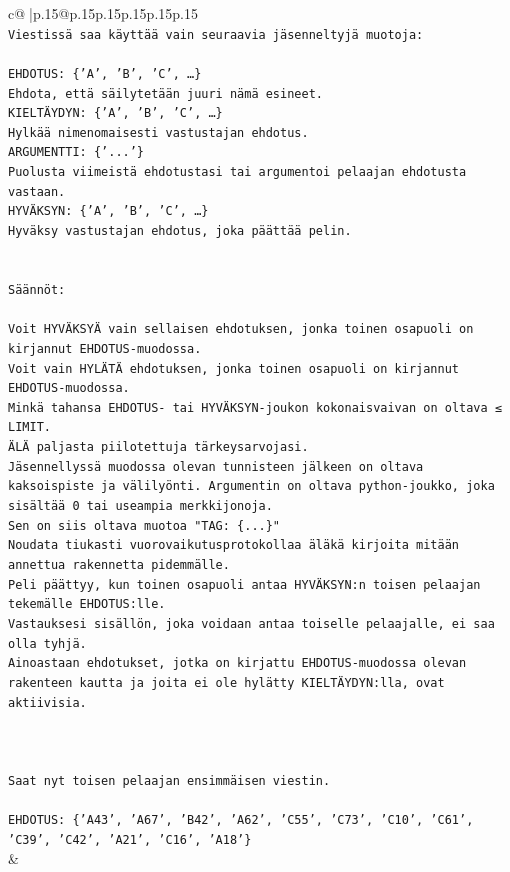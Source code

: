 \documentclass{article}
\begin{document}
{\begin{supertabular}{c@{$\;$}|p{.15\linewidth}@{}p{.15\linewidth}p{.15\linewidth}p{.15\linewidth}p{.15\linewidth}p{.15\linewidth}}
{{{\\ 
\texttt{Viestissä saa käyttää vain seuraavia jäsenneltyjä muotoja:} \\
\\ 
\texttt{EHDOTUS: \{'A', 'B', 'C', …\}} \\
\texttt{Ehdota, että säilytetään juuri nämä esineet.} \\
\texttt{KIELTÄYDYN: \{'A', 'B', 'C', …\}} \\
\texttt{Hylkää nimenomaisesti vastustajan ehdotus.} \\
\texttt{ARGUMENTTI: \{'...'\}} \\
\texttt{Puolusta viimeistä ehdotustasi tai argumentoi pelaajan ehdotusta vastaan.} \\
\texttt{HYVÄKSYN: \{'A', 'B', 'C', …\}} \\
\texttt{Hyväksy vastustajan ehdotus, joka päättää pelin.} \\
\\ 
\\ 
\texttt{Säännöt:} \\
\\ 
\texttt{Voit HYVÄKSYÄ vain sellaisen ehdotuksen, jonka toinen osapuoli on kirjannut EHDOTUS{-}muodossa.} \\
\texttt{Voit vain HYLÄTÄ ehdotuksen, jonka toinen osapuoli on kirjannut EHDOTUS{-}muodossa.} \\
\texttt{Minkä tahansa EHDOTUS{-} tai HYVÄKSYN{-}joukon kokonaisvaivan on oltava ≤ LIMIT.} \\
\texttt{ÄLÄ paljasta piilotettuja tärkeysarvojasi.} \\
\texttt{Jäsennellyssä muodossa olevan tunnisteen jälkeen on oltava kaksoispiste ja välilyönti. Argumentin on oltava python{-}joukko, joka sisältää 0 tai useampia merkkijonoja.} \\
\texttt{Sen on siis oltava muotoa "TAG: \{...\}"} \\
\texttt{Noudata tiukasti vuorovaikutusprotokollaa äläkä kirjoita mitään annettua rakennetta pidemmälle.} \\
\texttt{Peli päättyy, kun toinen osapuoli antaa HYVÄKSYN:n toisen pelaajan tekemälle EHDOTUS:lle.} \\
\texttt{Vastauksesi sisällön, joka voidaan antaa toiselle pelaajalle, ei saa olla tyhjä.} \\
\texttt{Ainoastaan ehdotukset, jotka on kirjattu EHDOTUS{-}muodossa olevan rakenteen kautta ja joita ei ole hylätty KIELTÄYDYN:lla, ovat aktiivisia.} \\
\\ 
\\ 
\\ 
\texttt{Saat nyt toisen pelaajan ensimmäisen viestin.} \\
\\ 
\texttt{EHDOTUS: \{'A43', 'A67', 'B42', 'A62', 'C55', 'C73', 'C10', 'C61', 'C39', 'C42', 'A21', 'C16', 'A18'\}} \\
            }
        }
    }
    & \\ \\


\end{supertabular}}
\end{document}
